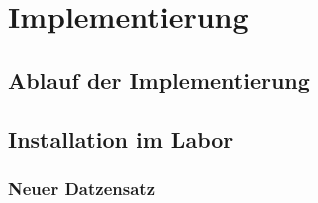 \chapter{Implementierung} \label{chap:implementierung}


\section{Ablauf der Implementierung} \label{sec:ablauf_der_implementierung}


\section{Installation im Labor} \label{sec:installation}


\subsection{Neuer Datzensatz} \label{subsec:neuer_datzensatz}